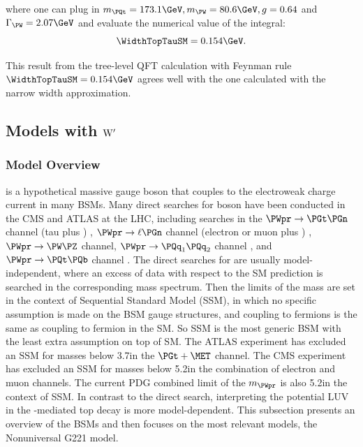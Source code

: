 \noindent where one can plug in $m_\PQt= 173.1 \GeV, m_\PW= 80.6 \GeV, g=0.64 $  and $\Gamma_{\PW} = 2.07\GeV$ and evaluate the numerical value of the integral:
\begin{equation}
         \WidthTopTauSM = 0.154 \GeV .
\end{equation} 


\noindent This result from the tree-level QFT calculation with Feynman rule  $\WidthTopTauSM = 0.154 \GeV$ agrees well with the one calculated with the narrow width approximation. 





 
\subsection{Models with $\rm W^\prime$}
\label{sec:relatedWorks:bsm:WPrime}

\subsubsection{Model Overview}
\PWpr is a hypothetical massive gauge boson that couples to the electroweak charge current in many BSMs. Many direct searches for \PWpr boson have been conducted in the CMS and ATLAS at the LHC, including searches in the $\PWpr\to \PGt \PGn $  channel (tau plus \MET) \cite{Sirunyan:2018lbg, Khachatryan:2015pua,Aaboud:2018vgh}, $\PWpr\to \ell \PGn$ channel (electron or muon plus \MET) \cite{Sirunyan:2018mpc, Aaboud:2017efa}, $\PWpr\to \PW \PZ$ channel\cite{Sirunyan:2018ivv, Aaboud:2017eta}, $\PWpr\to \PQq_1 \PQq_2$ channel \cite{Sirunyan:2016iap, Aaboud:2017yvp}, and $\PWpr\to \PQt \PQb$ channel \cite{Sirunyan:2017vkm, Aaboud:2018juj}. The direct searches for \PWpr are usually model-independent, where an excess of data with respect to the SM prediction is searched in the corresponding mass spectrum. Then the limits of the \PWpr mass are set in the context of Sequential Standard Model (SSM), in which no specific assumption is made on the BSM gauge structures, and \PWpr coupling to fermions is the same as \PW coupling to fermion in the SM. So SSM is the most generic \PWpr BSM with the least extra assumption on top of SM. The ATLAS experiment has excluded an SSM \PWpr for masses below 3.7\TeV in the $\PGt+\MET$ channel. The CMS experiment has excluded an SSM \PWpr for masses below 5.2\TeV in the combination of electron and muon channels. The current PDG combined limit of the $m_{\PWpr}$ is also 5.2\TeV in the context of SSM. In contrast to the direct search, interpreting the potential LUV in the \PWpr-mediated top decay is more model-dependent. This subsection presents an overview of the \PWpr BSMs and then focuses on the most relevant \PWpr models, the Nonuniversal G221 model.




